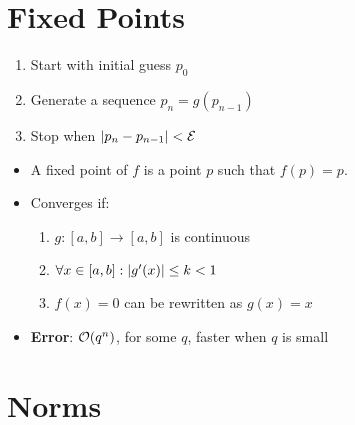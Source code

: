 \documentclass[8pt, letterpaper]{extarticle}
\newcommand{\bigEps}{\mathcal{E}}
\begin{document}
\begin{multicols*}{3}

  \section{Fixed Points}
  \begin{enumerate}
    \item Start with initial guess $p_0$
    \item Generate a sequence $p_n = g(p_{n-1})$
    \item Stop when $\abs{p_n - p_{n-1}} < \bigEps$
  \end{enumerate}
  \begin{itemize}
    \item A fixed point of $f$ is a point $p$ such that $f(p) = p$.
    \item Converges if:
      \begin{enumerate}
        \item $g:[a,b] \to [a,b]$ is continuous
        \item $\forall x \in [a,b]: \abs{g'(x)} \leq k < 1 $
        \item $f(x) = 0$ can be rewritten as $g(x) = x$
      \end{enumerate}
    \item \textbf{Error}: $\order{q^n}$, for some $q$, faster when $q$ is small
  \end{itemize}

  \section{Norms}


\end{multicols*}
\end{document}
